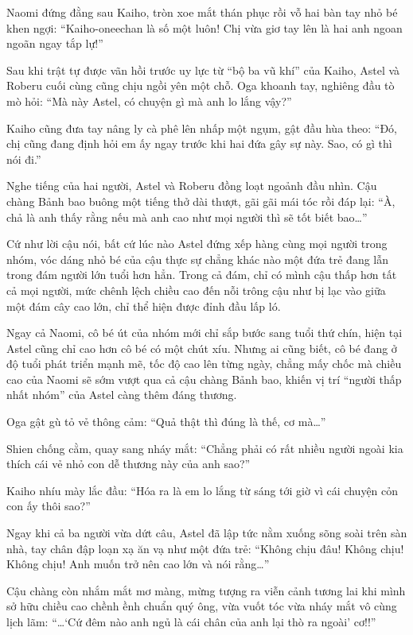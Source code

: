 \documentclass[../main.tex]{subfiles}
\begin{document}
Naomi đứng đằng sau Kaiho, tròn xoe mắt thán phục rồi vỗ hai bàn tay nhỏ bé khen ngợi: ``Kaiho-oneechan là số một luôn! Chị vừa giơ tay lên là hai anh ngoan ngoãn ngay tắp lự!''

\ct

Sau khi trật tự được vãn hồi trước uy lực từ ``bộ ba vũ khí'' của Kaiho, Astel và Roberu cuối cùng cũng chịu ngồi yên một chỗ. Oga khoanh tay, nghiêng đầu tò mò hỏi: ``Mà này Astel, có chuyện gì mà anh lo lắng vậy?''

Kaiho cũng đưa tay nâng ly cà phê lên nhấp một ngụm, gật đầu hùa theo: ``Đó, chị cũng đang định hỏi em ấy ngay trước khi hai đứa gây sự này. Sao, có gì thì nói đi.''

Nghe tiếng của hai người, Astel và Roberu đồng loạt ngoảnh đầu nhìn. Cậu chàng Bảnh bao buông một tiếng thở dài thượt, gãi gãi mái tóc rồi đáp lại: ``À, chả là anh thấy rằng nếu mà anh cao như mọi người thì sẽ tốt biết bao\dots''

Cứ như lời cậu nói, bất cứ lúc nào Astel đứng xếp hàng cùng mọi người trong nhóm, vóc dáng nhỏ bé của cậu thực sự chẳng khác nào một đứa trẻ đang lẫn trong đám người lớn tuổi hơn hẳn. Trong cả đám, chỉ có mình cậu thấp hơn tất cả mọi người, mức chênh lệch chiều cao đến nỗi trông cậu như bị lạc vào giữa một đám cây cao lớn, chỉ thể hiện được đỉnh đầu lấp ló.

Ngay cả Naomi, cô bé út của nhóm mới chỉ sắp bước sang tuổi thứ chín, hiện tại Astel cũng chỉ cao hơn cô bé có một chút xíu. Nhưng ai cũng biết, cô bé đang ở độ tuổi phát triển mạnh mẽ, tốc độ cao lên từng ngày, chẳng mấy chốc mà chiều cao của Naomi sẽ sớm vượt qua cả cậu chàng Bảnh bao, khiến vị trí ``người thấp nhất nhóm'' của Astel càng thêm đáng thương.

Oga gật gù tỏ vẻ thông cảm: ``Quả thật thì đúng là thế, cơ mà\dots''

Shien chống cằm, quay sang nháy mắt: ``Chẳng phải có rất nhiều người ngoài kia thích cái vẻ nhỏ con dễ thương này của anh sao?''

Kaiho nhíu mày lắc đầu: ``Hóa ra là em lo lắng từ sáng tới giờ vì cái chuyện cỏn con ấy thôi sao?''

Ngay khi cả ba người vừa dứt câu, Astel đã lập tức nằm xuống sõng soài trên sàn nhà, tay chân đập loạn xạ ăn vạ như một đứa trẻ: ``Không chịu đâu! Không chịu! Không chịu! Anh muốn trở nên cao lớn và nói rằng\dots''


Cậu chàng còn nhắm mắt mơ màng, mừng tượng ra viễn cảnh tương lai khi mình sở hữu chiều cao chềnh ềnh chuẩn quý ông, vừa vuốt tóc vừa nháy mắt vô cùng lịch lãm: ``\dots `Cứ đêm nào anh ngủ là cái chân của anh lại thò ra ngoài' cơ!!''
\end{document}
